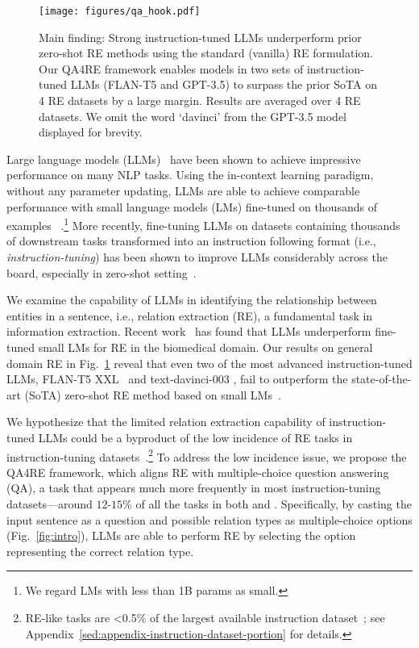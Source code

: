 
\begin{figure}[!t]
 \centering
 \small
 \texttt{[image: figures/qa\_hook.pdf]}
\caption{Main finding: Strong instruction-tuned LLMs underperform prior zero-shot RE methods using the standard (vanilla) RE formulation. Our QA4RE framework enables models in two sets of instruction-tuned LLMs (FLAN-T5 and GPT-3.5) to surpass the prior SoTA on 4 RE datasets by a large margin. Results are averaged over 4 RE datasets. We omit the word `davinci' from the GPT-3.5 model displayed for brevity.}
        \label{fig:hook-figure}
\vspace{-5pt}
\end{figure}

Large language models (LLMs)~\cite{Brown2020GPT3, Chowdhery2022PaLM, Zhang2022OPT} have been shown to achieve impressive performance on many NLP tasks. 
Using the in-context learning paradigm, without any parameter updating, LLMs are able to achieve comparable performance with small language models (LMs) fine-tuned on thousands of examples ~\cite{Liu2022KATE, Min2022Channel, Liang2022HolisticEO}.\footnote{We regard LMs with less than 1B params as small.}
More recently, fine-tuning LLMs on datasets containing thousands of downstream tasks transformed into an instruction following format (i.e., \textit{instruction-tuning}) has been shown to improve LLMs considerably across the board, especially in zero-shot setting~\cite{Iyer2022OPT-IML, Ouyang2022InstructGPT, ChungFlanT5}. 

We examine the capability of LLMs in identifying the relationship between entities in a sentence, i.e., relation extraction (RE), a fundamental task in information extraction.
Recent work~\cite{Gutierrez2022GPT3BioIE} has found that LLMs underperform fine-tuned small LMs for RE in the biomedical domain. 
Our results on general domain RE in Fig.~\ref{fig:hook-figure} reveal that even two of the most advanced instruction-tuned LLMs, FLAN-T5 XXL~\cite{ChungFlanT5} and text-davinci-003 \cite{Ouyang2022InstructGPT}, fail to outperform the state-of-the-art (SoTA) zero-shot RE method based on small LMs~\cite{Sainz2021NLI}.








We hypothesize that the limited relation extraction capability of instruction-tuned LLMs could be a byproduct of the low incidence of RE tasks in instruction-tuning datasets~\cite{Ouyang2022InstructGPT, Sanh2022T0, ChungFlanT5, Wang2022SuperInstructions}.\footnote{RE-like tasks are <0.5\% of the largest available instruction dataset~\cite{Wang2022SuperInstructions}; see Appendix~\ref{sed:appendix-instruction-dataset-portion} for details.}
To address the low incidence issue, we propose the QA4RE framework, which aligns RE with multiple-choice question answering (QA), a task that appears much more frequently in most instruction-tuning datasets---around $12$-$15$\% of all the tasks in both \citet{Wang2022SuperInstructions} and \citet{Ouyang2022InstructGPT}. 
Specifically, by casting the input sentence as a question and possible relation types as multiple-choice options (Fig.~\ref{fig:intro}), LLMs are able to perform RE by selecting the option representing the correct relation type.

